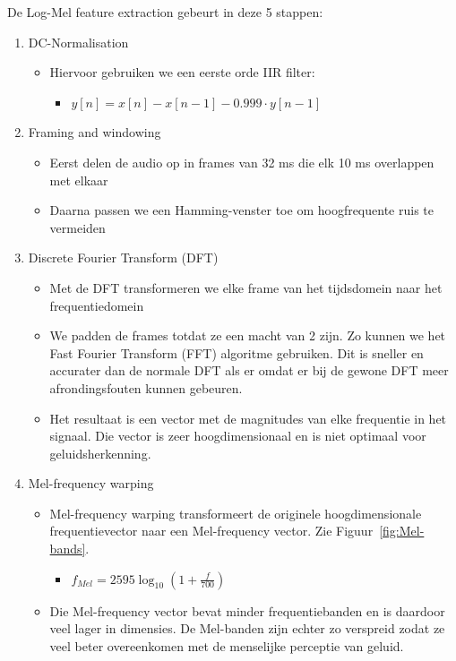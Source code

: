 \begin{no-awa} %
De  Log-Mel feature extraction gebeurt in deze 5 stappen:

\begin{enumerate}
	\item DC-Normalisation
	      \begin{itemize}
		      \item Hiervoor gebruiken we een eerste orde IIR filter:
		            \begin{itemize}[label={}]
			            \item \(y\left[ n \right] = x\left[ n \right] - x\left[ n - 1 \right] -0.999 \cdot y\left[ n - 1 \right]\)
		            \end{itemize}
	      \end{itemize}

	\item Framing and windowing
	      \begin{itemize}
		      \item Eerst delen de audio op in frames van 32 ms die elk 10 ms overlappen met elkaar
		      \item Daarna passen we een Hamming-venster toe om hoogfrequente ruis te vermeiden \cite{enwiki:windowing}
	      \end{itemize}

	\item Discrete Fourier Transform (DFT)
	      \begin{itemize}
		      \item Met de DFT transformeren we elke frame van het tijdsdomein naar het frequentiedomein
		      \item We padden de frames totdat ze een macht van 2 zijn. Zo kunnen we het Fast Fourier Transform (FFT) algoritme gebruiken. Dit is sneller en accurater dan de normale DFT als er omdat er bij de gewone DFT meer afrondingsfouten kunnen gebeuren. \cite{enwiki:FFT}
		      \item Het resultaat is een vector met de magnitudes van elke frequentie in het signaal. Die vector is zeer hoogdimensionaal en is niet optimaal voor geluidsherkenning.
	      \end{itemize}

	\item Mel-frequency warping
	      \begin{itemize}
		      \item Mel-frequency warping transformeert de originele hoogdimensionale frequentievector naar een Mel-frequency vector. Zie Figuur~\ref{fig:Mel-bands}.
		            \begin{itemize}[label={}]
			            \item \(f_{Mel} = 2595\log_{10}(1 + \frac{f}{700})\)
		            \end{itemize}
		      \item Die Mel-frequency vector bevat minder frequentiebanden en is daardoor veel lager in dimensies. De Mel-banden zijn echter zo verspreid zodat ze veel beter overeenkomen met de menselijke perceptie van geluid.
	      \end{itemize}


\end{enumerate}
\end{no-awa}
